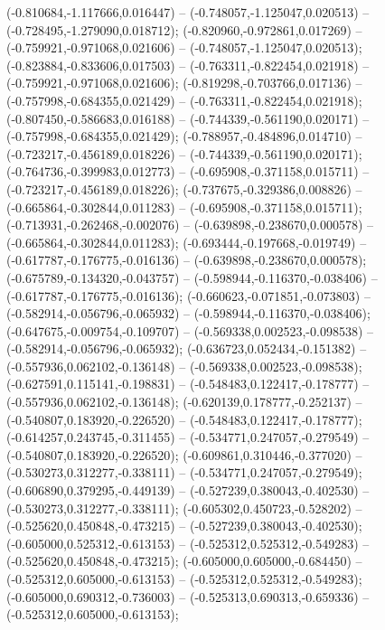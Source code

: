  (-0.810684,-1.117666,0.016447) -- (-0.748057,-1.125047,0.020513) -- (-0.728495,-1.279090,0.018712);
 (-0.820960,-0.972861,0.017269) -- (-0.759921,-0.971068,0.021606) -- (-0.748057,-1.125047,0.020513);
 (-0.823884,-0.833606,0.017503) -- (-0.763311,-0.822454,0.021918) -- (-0.759921,-0.971068,0.021606);
 (-0.819298,-0.703766,0.017136) -- (-0.757998,-0.684355,0.021429) -- (-0.763311,-0.822454,0.021918);
 (-0.807450,-0.586683,0.016188) -- (-0.744339,-0.561190,0.020171) -- (-0.757998,-0.684355,0.021429);
 (-0.788957,-0.484896,0.014710) -- (-0.723217,-0.456189,0.018226) -- (-0.744339,-0.561190,0.020171);
 (-0.764736,-0.399983,0.012773) -- (-0.695908,-0.371158,0.015711) -- (-0.723217,-0.456189,0.018226);
 (-0.737675,-0.329386,0.008826) -- (-0.665864,-0.302844,0.011283) -- (-0.695908,-0.371158,0.015711);
 (-0.713931,-0.262468,-0.002076) -- (-0.639898,-0.238670,0.000578) -- (-0.665864,-0.302844,0.011283);
 (-0.693444,-0.197668,-0.019749) -- (-0.617787,-0.176775,-0.016136) -- (-0.639898,-0.238670,0.000578);
 (-0.675789,-0.134320,-0.043757) -- (-0.598944,-0.116370,-0.038406) -- (-0.617787,-0.176775,-0.016136);
 (-0.660623,-0.071851,-0.073803) -- (-0.582914,-0.056796,-0.065932) -- (-0.598944,-0.116370,-0.038406);
 (-0.647675,-0.009754,-0.109707) -- (-0.569338,0.002523,-0.098538) -- (-0.582914,-0.056796,-0.065932);
 (-0.636723,0.052434,-0.151382) -- (-0.557936,0.062102,-0.136148) -- (-0.569338,0.002523,-0.098538);
 (-0.627591,0.115141,-0.198831) -- (-0.548483,0.122417,-0.178777) -- (-0.557936,0.062102,-0.136148);
 (-0.620139,0.178777,-0.252137) -- (-0.540807,0.183920,-0.226520) -- (-0.548483,0.122417,-0.178777);
 (-0.614257,0.243745,-0.311455) -- (-0.534771,0.247057,-0.279549) -- (-0.540807,0.183920,-0.226520);
 (-0.609861,0.310446,-0.377020) -- (-0.530273,0.312277,-0.338111) -- (-0.534771,0.247057,-0.279549);
 (-0.606890,0.379295,-0.449139) -- (-0.527239,0.380043,-0.402530) -- (-0.530273,0.312277,-0.338111);
 (-0.605302,0.450723,-0.528202) -- (-0.525620,0.450848,-0.473215) -- (-0.527239,0.380043,-0.402530);
 (-0.605000,0.525312,-0.613153) -- (-0.525312,0.525312,-0.549283) -- (-0.525620,0.450848,-0.473215);
 (-0.605000,0.605000,-0.684450) -- (-0.525312,0.605000,-0.613153) -- (-0.525312,0.525312,-0.549283);
 (-0.605000,0.690312,-0.736003) -- (-0.525313,0.690313,-0.659336) -- (-0.525312,0.605000,-0.613153);
